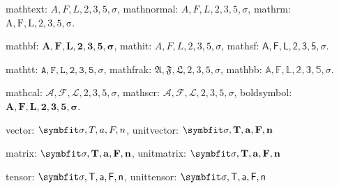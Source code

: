 {mathtext: $A,F,L,2,3,5,\sigma$, mathnormal: $A,F,L,2,3,5,\sigma$, mathrm: $\mathrm{A,F,L,2,3,5,\sigma}$.

mathbf: $\mathbf{A,F,L,2,3,5,\sigma}$, mathit: $\mathit{A,F,L,2,3,5,\sigma}$, mathsf: $\mathsf{A,F,L,2,3,5,\sigma}$.

mathtt: $\mathtt{A,F,L,2,3,5,\sigma}$, mathfrak: $\mathfrak{A,F,L,2,3,5,\sigma}$, mathbb: $\mathbb{A,F,L,2,3,5,\sigma}$.

mathcal: $\mathcal{A,F,L,2,3,5,\sigma}$, mathscr: $\mathscr{A,F,L,2,3,5,\sigma}$, boldsymbol: $\boldsymbol{A,F,L,2,3,5,\sigma}$.

vector: $\Vector{\sigma, T, a, F, n}$, unitvector: $\unitVector{\sigma, T, a, F, n}$

matrix: $\Matrix{\sigma, T, a, F, n}$, unitmatrix: $\unitMatrix{\sigma, T, a, F, n}$

tensor: $\Tensor{\sigma, T, a, F, n}$, unittensor: $\unitTensor{\sigma, T, a, F, n}$ 


\thispagestyle{appendixheader}
}

